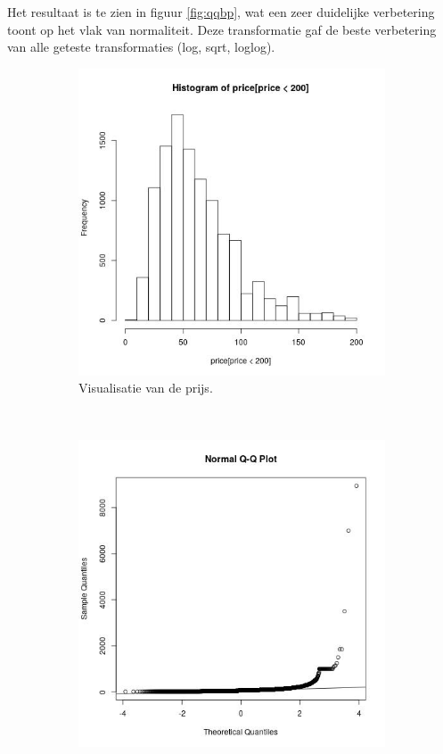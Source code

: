 \documentclass[a4paper,kulak]{kulakarticle} %
\begin{document}
Het resultaat is te zien in figuur \ref{fig:qqbp}, wat een zeer duidelijke verbetering toont op het vlak van normaliteit.
Deze transformatie gaf de beste verbetering van alle geteste transformaties (log, sqrt, loglog).
\begin{figure}[H]
	\centering
	\begin{subfigure}[b]{0.45\textwidth}
		\includegraphics[width=\textwidth]{prijsVis.jpg}
		\caption{Visualisatie van de prijs.}
		\label{fig:pv}
	\end{subfigure}
	~ %
	\begin{subfigure}[b]{0.45\textwidth}
		\includegraphics[width=\textwidth]{qqp.jpg}

\end{subfigure}
\end{figure}
\end{document}
